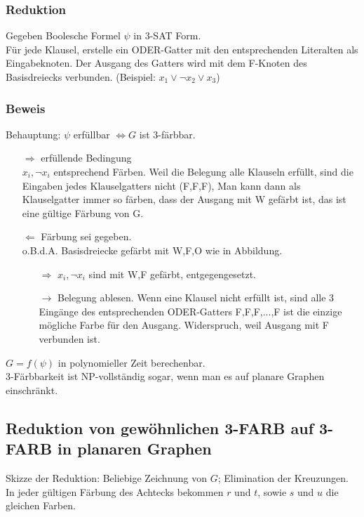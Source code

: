 \subsubsection{Reduktion}
Gegeben Boolesche Formel $\psi$ in 3-SAT Form.\\

Für jede Klausel, erstelle ein ODER-Gatter mit den entsprechenden Literalten als Eingabeknoten. Der Ausgang des Gatters wird mit dem F-Knoten des Basisdreiecks verbunden. (Beispiel: $x_1 \lor \lnot{x}_2 \lor x_3$)\\
\subsubsection{Beweis}
Behauptung: $\psi$ erfüllbar $\Leftrightarrow G$ ist 3-färbbar. 
\begin{enumerate}
\item[$\Rightarrow$] erfüllende Bedingung\\
$x_i, \lnot x_i$ entsprechend Färben. Weil die Belegung alle Klauseln erfüllt, sind die Eingaben jedes Klauselgatters nicht (F,F,F), Man kann dann als Klauselgatter immer so färben, dass der Ausgang mit W gefärbt ist, das ist eine gültige Färbung von G.\\
\item[$\Leftarrow$] Färbung sei gegeben.\\
o.B.d.A. Basisdreiecke gefärbt mit W,F,O wie in Abbildung.
\begin{enumerate}
\item[$\Rightarrow$] $x_i, \lnot x_i$ sind mit W,F gefärbt, entgegengesetzt.
\item[$\rightarrow$] Belegung ablesen. Wenn eine Klausel nicht erfüllt ist, sind alle 3 Eingänge des entsprechenden ODER-Gatters F,F,F,...,F ist die einzige mögliche Farbe für den Ausgang. Widerspruch, weil Ausgang mit F verbunden ist.
\end{enumerate}
\end{enumerate}
$G = f(\psi)$ in polynomieller Zeit berechenbar. \checkmark \\
3-Färbbarkeit ist NP-vollständig sogar, wenn man es auf planare Graphen einschränkt.\\
\subsection{Reduktion von gewöhnlichen 3-FARB auf 3-FARB in planaren Graphen}
Skizze der Reduktion: Beliebige Zeichnung von $G$; Elimination der Kreuzungen.\\
In jeder gültigen Färbung des Achtecks bekommen $r$ und $t$, sowie $s$ und $u$ die gleichen Farben.\\

